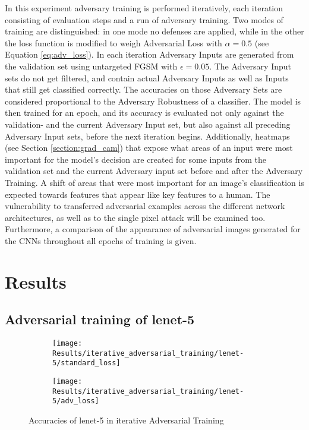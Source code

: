 \documentclass[draft,final]{vutinfth} %
\begin{document}
In this experiment adversary training is performed iteratively, each iteration consisting of evaluation steps and a run of adversary training.
Two modes of training are distinguished: in one mode no defenses are applied, while in the other the loss function is modified to weigh Adversarial Loss with $\alpha = 0.5$ (see Equation \ref{eq:adv_loss}).
In each iteration Adversary Inputs are generated from the validation set using untargeted FGSM with $\epsilon = 0.05$.
The Adversary Input sets do not get filtered, and contain actual Adversary Inputs as well as Inputs that still get classified correctly.
The accuracies on those Adversary Sets are considered proportional to the Adversary Robustness of a classifier.
The model is then trained for an epoch, and its accuracy is evaluated not only against the validation- and the current Adversary Input set, but also against all preceding Adversary Input sets, before the next iteration begins.
Additionally, heatmaps (see Section \ref{section:grad_cam}) that expose what areas of an input were most important for the model's decision are created for some inputs from the validation set and the current Adversary input set before and after the Adversary Training.
A shift of areas that were most important for an image's classification is expected towards features that appear like key features to a human.
The vulnerability to transferred adversarial examples across the different network architectures, as well as to the single pixel attack will be examined too.
Furthermore, a comparison of the appearance of adversarial images generated for the CNNs throughout all epochs of training is given.
\newpage

\section{Results}

\subsection{Adversarial training of lenet-5}

\begin{figure}[h]
  \begin{subfigure}[b]{0.5\columnwidth}
		\centering
    \texttt{[image: Results/iterative\_adversarial\_training/lenet-5/standard\_loss]}
    \label{fig:exp:iat:lenet-5:data}
  \end{subfigure}
  \begin{subfigure}[b]{0.5\columnwidth}
		\centering
    \texttt{[image: Results/iterative\_adversarial\_training/lenet-5/adv\_loss]}
    \label{fig:exp:iat:lenet-5:loss}
  \end{subfigure}
  \caption{Accuracies of lenet-5 in iterative Adversarial Training}
	\label{fig:exp:iat:lenet-5}
\end{figure}
\end{document}
